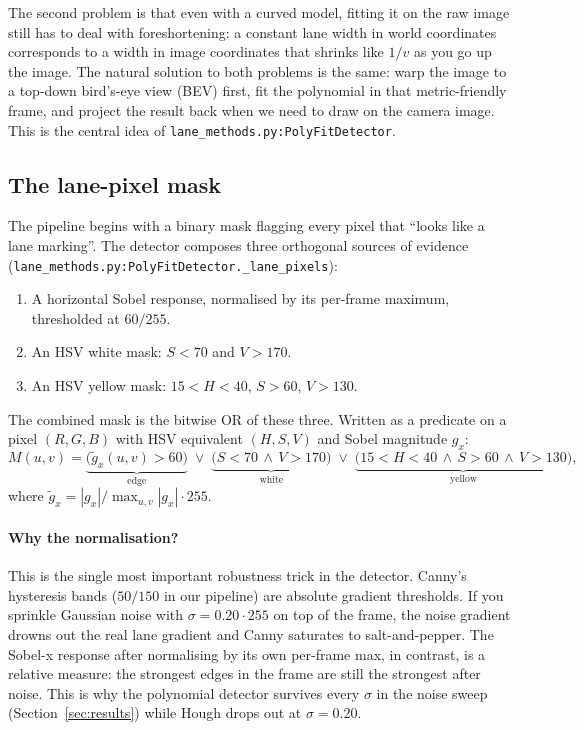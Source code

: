 The second problem is that even with a curved model, fitting it on the
raw image still has to deal with foreshortening: a constant lane width
in world coordinates corresponds to a width in image coordinates that
shrinks like $1/v$ as you go up the image. The natural solution to
both problems is the same: warp the image to a top-down bird's-eye
view (BEV) first, fit the polynomial in that metric-friendly frame,
and project the result back when we need to draw on the camera image.
This is the central idea of \texttt{lane\_methods.py:PolyFitDetector}.

\subsection{The lane-pixel mask}

The pipeline begins with a binary mask flagging every pixel that
``looks like a lane marking''. The detector composes three orthogonal
sources of evidence
(\texttt{lane\_methods.py:PolyFitDetector.\_lane\_pixels}):
\begin{enumerate}[leftmargin=1.8em,itemsep=2pt]
  \item A horizontal Sobel response, normalised by its per-frame
        maximum, thresholded at $60/255$.
  \item An HSV white mask: $S<70$ and $V>170$.
  \item An HSV yellow mask: $15<H<40$, $S>60$, $V>130$.
\end{enumerate}
The combined mask is the bitwise OR of these three. Written as a
predicate on a pixel $(R,G,B)$ with HSV equivalent $(H,S,V)$ and
Sobel magnitude $g_x$:
\[
M(u,v) = \underbrace{\bigl(\tilde g_x(u,v)>60\bigr)}_{\text{edge}}
       \;\lor\; \underbrace{\bigl(S<70\,\wedge\,V>170\bigr)}_{\text{white}}
       \;\lor\; \underbrace{\bigl(15<H<40\,\wedge\,S>60\,\wedge\,V>130\bigr)}_{\text{yellow}},
\]
where $\tilde g_x = |g_x|/\max_{u,v}|g_x|\cdot 255$.

\paragraph{Why the normalisation?}
This is the single most important robustness trick in the detector.
Canny's hysteresis bands ($50/150$ in our pipeline) are absolute
gradient thresholds. If you sprinkle Gaussian noise with
$\sigma=0.20\cdot 255$ on top of the frame, the noise gradient drowns
out the real lane gradient and Canny saturates to salt-and-pepper. The
Sobel-x response after normalising by its own per-frame max, in
contrast, is a relative measure: the strongest edges in the frame are
still the strongest after noise. This is why the polynomial detector
survives every $\sigma$ in the noise sweep (Section~\ref{sec:results})
while Hough drops out at $\sigma=0.20$.

